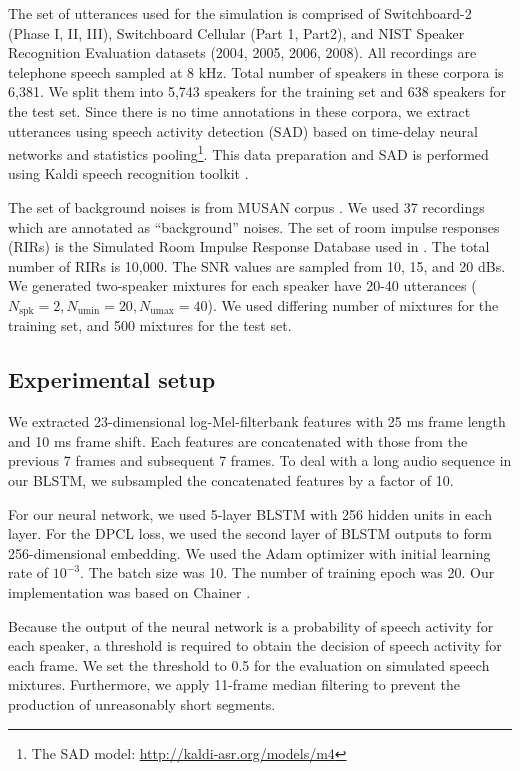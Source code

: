 \documentclass[a4paper]{article}
\begin{document}
The set of utterances used for the simulation is comprised of Switchboard-2 (Phase I, II, III), Switchboard Cellular (Part 1, Part2), and NIST Speaker Recognition Evaluation datasets (2004, 2005, 2006, 2008). All recordings are telephone speech sampled at 8 kHz.
Total number of speakers in these corpora is 6,381.
We split them into 5,743 speakers for the training set and 638 speakers for the test set.
Since there is no time annotations in these corpora, we extract utterances using speech activity detection (SAD) based on time-delay neural networks and statistics pooling\footnote{The SAD model: \url{http://kaldi-asr.org/models/m4}}. This data preparation and SAD is performed using Kaldi speech recognition toolkit \cite{Povey_ASRU2011}.

The set of background noises is from MUSAN corpus \cite{Snyder2015}. We used 37 recordings which are annotated as ``background'' noises.
The set of room impulse responses (RIRs) is the Simulated Room Impulse Response Database used in \cite{Ko2017}. The total number of RIRs is 10,000.
The SNR values are sampled from 10, 15, and 20 dBs.
We generated two-speaker mixtures for each speaker have 20-40 utterances ($N_{\text{spk}} = 2, N_{\text{umin}}=20, N_{\text{umax}}=40$).
We used differing number of mixtures for the training set, and 500 mixtures for the test set.

\subsection{Experimental setup}
We extracted 23-dimensional log-Mel-filterbank features with 25 ms frame length and 10 ms frame shift.
Each features are concatenated with those from the previous 7 frames and subsequent 7 frames.
To deal with a long audio sequence in our BLSTM, we subsampled the concatenated features by a factor of 10.

For our neural network, we used 5-layer BLSTM with 256 hidden units in each layer. For the DPCL loss, we used the second layer of BLSTM outputs to form 256-dimensional embedding.
We used the Adam \cite{Kingma2014} optimizer with initial learning rate of $10^{-3}$.
The batch size was 10.
The number of training epoch was 20.
Our implementation was based on Chainer \cite{chainer_learningsys2015}.

Because the output of the neural network is a probability of speech activity for each speaker, a threshold is required to obtain the decision of speech activity for each frame. We set the threshold to 0.5 for the evaluation on simulated speech mixtures.
Furthermore, we apply 11-frame median filtering to prevent the production of unreasonably short segments.
\end{document}
